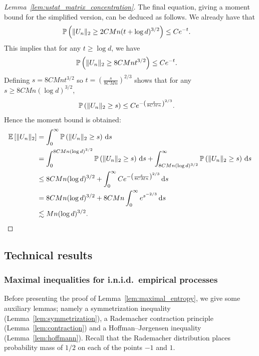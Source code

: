 \begin{proof}[Lemma~\ref{lem:ustat_matrix_concentration}]
  The final equation,
  giving a moment bound for the simplified version,
  can be deduced as follows.
  We already have that
  \begin{align*}
    \P\left(
      \|U_n\|_2
      \geq
      2 C M n
      (t + \log d)^{3/2}
    \right)
    &\leq
    C e^{-t}.
  \end{align*}
  This implies that for any $t \geq \log d$,
  we have
  \begin{align*}
    \P\left(
      \|U_n\|_2
      \geq
      8 C M n
      t^{3/2}
    \right)
    &\leq
    C e^{-t}.
  \end{align*}
  Defining
  $s = 8 C M n t^{3/2}$
  so $t = \left( \frac{s}{8C M n} \right)^{2/3}$
  shows that for any $s \geq 8C M n(\log d)^{3/2}$,
  \begin{align*}
    \P\left(
      \|U_n\|_2
      \geq
      s
    \right)
    &\leq
    C e^{-\left( \frac{s}{8C M n} \right)^{2/3}}.
  \end{align*}
  Hence the moment bound is obtained:
  \begin{align*}
    \E\left[
      \|U_n\|_2
    \right]
    &=
    \int_0^\infty
    \P\left(
      \|U_n\|_2
      \geq
      s
    \right)
    \diff{s} \\
    &=
    \int_0^{8C M n(\log d)^{3/2}}
    \P\left(
      \|U_n\|_2
      \geq
      s
    \right)
    \diff{s}
    +
    \int_{8C M n(\log d)^{3/2}}^\infty
    \P\left(
      \|U_n\|_2
      \geq
      s
    \right)
    \diff{s} \\
    &\leq
    8C M n(\log d)^{3/2}
    +
    \int_0^\infty
    C e^{-\left( \frac{s}{8C M n} \right)^{2/3}}
    \diff{s} \\
    &=
    8C M n(\log d)^{3/2}
    +
    8C M n
    \int_0^\infty
    e^{s^{-2/3}}
    \diff{s} \\
    &\lesssim
    Mn(\log d)^{3/2}.
  \end{align*}
\end{proof}

\subsection{Technical results}

\subsubsection{Maximal inequalities for i.n.i.d.\ empirical processes}

Before presenting the proof of
Lemma~\ref{lem:maximal_entropy},
we give some auxiliary lemmas;
namely a symmetrization inequality
(Lemma~\ref{lem:symmetrization}),
a Rademacher contraction principle
(Lemma~\ref{lem:contraction})
and a Hoffman--J{\o}rgensen inequality
(Lemma~\ref{lem:hoffmann}).
Recall that the Rademacher distribution
places probability mass of $1/2$
on each of the points $-1$ and $1$.

